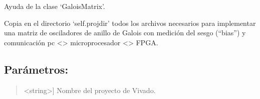 \documentclass[letterpaper,10pt,english]{sphinxmanual}
\begin{document}
\begin{fulllineitems}
\begin{fulllineitems}
\end{fulllineitems}


\begin{fulllineitems}
\label{\detokenize{myfpga:myfpga.ring_osc.GaloisMatrix.help}}
\pysigstartsignatures
{}
\pysigstopsignatures
\sphinxAtStartPar
Ayuda de la clase ‘GaloisMatrix’.

\end{fulllineitems}


\begin{fulllineitems}
\label{\detokenize{myfpga:myfpga.ring_osc.GaloisMatrix.implement}}
\pysigstartsignatures
{}
\pysigstopsignatures
\sphinxAtStartPar
Copia en el directorio ‘self.projdir’ todos los archivos necesarios para 
implementar una matriz de osciladores de anillo de Galois con medición 
del sesgo (“bias”) y comunicación pc \textless{}\sphinxhyphen{}\textgreater{} microprocesador \textless{}\sphinxhyphen{}\textgreater{} FPGA.


\subsection{Parámetros:}
\label{\detokenize{myfpga:id1}}\begin{quote}
\begin{description}
\sphinxlineitem{projname}{[}\textless{}string\textgreater{}{]}
\sphinxAtStartPar
Nombre del proyecto de Vivado.


\end{description}
\end{quote}
\end{fulllineitems}
\end{fulllineitems}
\end{document}
